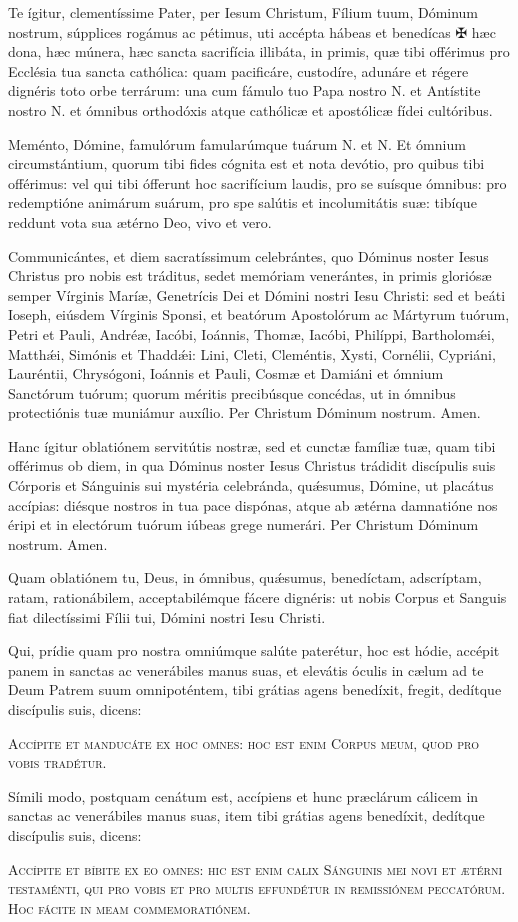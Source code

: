 Te ígitur, clementíssime Pater, per Iesum Christum, Fílium tuum, Dóminum nostrum, súpplices rogámus ac pétimus, uti accépta hábeas et benedícas {\color{red}✠} hæc dona, hæc múnera, hæc sancta sacrifícia illibáta, in primis, quæ tibi offérimus pro Ecclésia tua sancta cathólica: quam pacificáre, custodíre, adunáre et régere dignéris toto orbe terrárum: una cum fámulo tuo Papa nostro {\color{red}N.} et Antístite nostro {\color{red}N.} \grestar{} et ómnibus orthodóxis atque cathólicæ et apostólicæ fídei cultóribus.

Meménto, Dómine, famulórum famularúmque tuárum {\color{red}N.} et {\color{red}N.} Et ómnium circumstántium, quorum tibi fides cógnita est et nota devótio, pro quibus tibi offérimus: vel qui tibi ófferunt hoc sacrifícium laudis, pro se suísque ómnibus: pro redemptióne animárum suárum, pro spe salútis et incolumitátis suæ: tibíque reddunt vota sua ætérno Deo, vivo et vero.

Communicántes, et diem sacratíssimum celebrántes, quo Dóminus noster Iesus Christus pro nobis est tráditus, sedet memóriam venerántes, in primis gloriósæ semper Vírginis Maríæ, Genetrícis Dei et Dómini nostri Iesu Christi: sed et beáti Ioseph, eiúsdem Vírginis Sponsi, et beatórum Apostolórum ac Mártyrum tuórum, Petri et Pauli, Andréæ, Iacóbi, Ioánnis, Thomæ, Iacóbi, Philíppi, Bartholomǽi, Matthǽi, Simónis et Thaddǽi: Lini, Cleti, Cleméntis, Xysti, Cornélii, Cypriáni, Lauréntii, Chrysógoni, Ioánnis et Pauli, Cosmæ et Damiáni et ómnium Sanctórum tuórum; quorum méritis precibúsque concédas, ut in ómnibus protectiónis tuæ muniámur auxílio. Per Christum Dóminum nostrum. Amen.

Hanc ígitur oblatiónem servitútis nostræ, sed et cunctæ famíliæ tuæ, quam tibi offérimus ob diem, in qua Dóminus noster Iesus Christus trádidit discípulis suis Córporis et Sánguinis sui mystéria celebránda, quǽsumus, Dómine, ut placátus accípias: diésque nostros in tua pace dispónas, atque ab ætérna damnatióne nos éripi et in electórum tuórum iúbeas grege numerári. Per Christum Dóminum nostrum. Amen.

Quam oblatiónem tu, Deus, in ómnibus, quǽsumus, benedíctam, adscríptam, ratam, rationábilem, acceptabilémque fácere dignéris: ut nobis Corpus et Sanguis fiat dilectíssimi Fílii tui, Dómini nostri Iesu Christi.

Qui, prídie quam pro nostra omniúmque salúte paterétur, hoc est hódie, accépit panem in sanctas ac venerábiles manus suas, et elevátis óculis in cælum ad te Deum Patrem suum omnipoténtem, tibi grátias agens benedíxit, fregit, dedítque discípulis suis, dicens:

\textsc{Accípite et manducáte ex hoc omnes: hoc est enim Corpus meum, quod pro vobis tradétur.}

Símili modo, postquam cenátum est, accípiens et hunc præclárum cálicem in sanctas ac venerábiles manus suas, item tibi grátias agens benedíxit, dedítque discípulis suis, dicens:

\textsc{Accípite et bíbite ex eo omnes: hic est enim calix Sánguinis mei novi et ætérni testaménti, qui pro vobis et pro multis effundétur in remissiónem peccatórum. Hoc fácite in meam commemoratiónem.}
